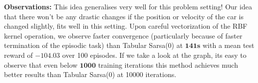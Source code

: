 \documentclass[11pt]{article}
\begin{document}
        
    \textbf{Observations: } This idea generalises very well for this problem setting! Our idea that there won't be any drastic changes if the position or velocity of the car is changed slightly, fits well in this setting. Upon careful vectorization of the RBF kernel operation, we observe faster convergence (particularly because of faster termination of the episodic task) than Tabular Sarsa(0) at $\mathbf{141s}$ with a mean test reward of $\mathbf{-104.03}$ over 100 episodes. If we take a look at the graph, its easy to observe that even below $\mathbf{1000}$ training iterations this method achieves much better results than Tabular Sarsa(0) at 10000 iterations.
    
    
\end{document}
